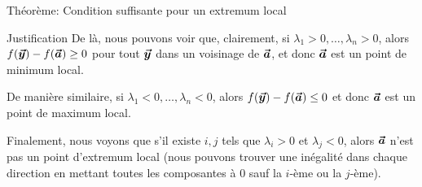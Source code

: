 \documentclass[a4paper]{article}
\begin{document}
\begin{parag}{Théorème: Condition suffisante pour un extremum local}
\begin{subparag}{Justification}
        De là, nous pouvons voir que, clairement, si $\lambda_1 > 0, \ldots, \lambda_n > 0$, alors $f\left(\bvec{y}\right) - f\left(\bvec{a}\right) \geq 0$ pour tout $\bm{\protect\vec{y}}$ dans un voisinage de $\bm{\protect\vec{a}}$, et donc $\bm{\protect\vec{a}}$ est un point de minimum local. 

        De manière similaire, si $\lambda_1 < 0, \ldots, \lambda_n < 0$, alors $f\left(\bvec{y}\right) - f\left(\bvec{a}\right) \leq 0$ et donc $\bm{\protect\vec{a}}$ est un point de maximum local.

        Finalement, nous voyons que s'il existe $i, j$ tels que $\lambda_i > 0$ et $\lambda_j < 0$, alors $\bm{\protect\vec{a}}$ n'est pas un point d'extremum local (nous pouvons trouver une inégalité dans chaque direction en mettant toutes les composantes à 0 sauf la $i$-ème ou la $j$-ème).
    \end{subparag}
\end{parag}
\end{document}
